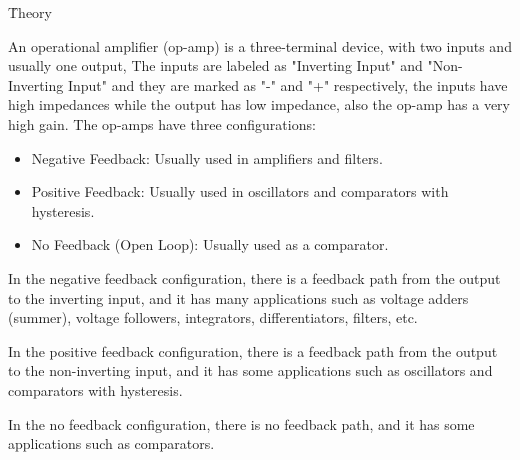 \documentclass[12pt]{article}
\begin{document}
\tableofcontents
\clearpage
\setlength{\parskip}{\baselineskip}%
\listoffigures
\clearpage
\listoftables
\clearpage
{}
\h{Theory}


An operational amplifier (op-amp) is a three-terminal device, with two inputs and usually one output, The inputs are labeled as "Inverting Input" and "Non-Inverting Input" and they are marked as "-" and "+" respectively, the inputs have high impedances while the output has low impedance, also the op-amp has a very high gain. The op-amps have three configurations:
\begin{itemize}
    \item Negative Feedback: Usually used in amplifiers and filters.
    \item Positive Feedback: Usually used in oscillators and comparators with hysteresis.
    \item No Feedback (Open Loop): Usually used as a comparator.
\end{itemize}


In the negative feedback configuration, there is a feedback path from the output to the inverting input, and it has many applications such as voltage adders (summer), voltage followers, integrators, differentiators, filters, etc.

In the positive feedback configuration, there is a feedback path from the output to the non-inverting input, and it has some applications such as oscillators and comparators with hysteresis.

In the no feedback configuration, there is no feedback path, and it has some applications such as comparators.
\end{document}
